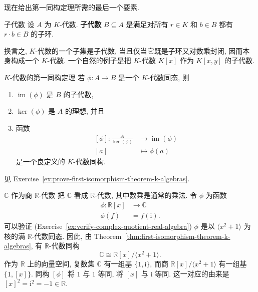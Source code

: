 现在给出第一同构定理所需的最后一个要素.

\begin{Definition}{子代数}\leavevmode\label{def:k-subalgebra}
  设 $A$ 为 $K$-代数. \textbf{子代数} $B\subseteq A$ 是满足对所有 $r\in K$ 和 $b\in B$ 都有 $r\cdot b\in B$ 的子环.
\end{Definition}

换言之, $K$-代数的一个子集是子代数, 当且仅当它既是子环又对数乘封闭, 因而本身构成一个 $K$-代数. 一个自然的例子是把 $K$-代数 $K[x]$ 作为 $K[x,y]$ 的子代数.

\begin{Theorem}{$K$-代数的第一同构定理}\leavevmode\label{thm:first-isomorphism-theorem-k-algebras}
  若 $\phi:A\to B$ 是一个 $K$-代数同态, 则
  \begin{enumerate}[label=(\roman*)]
    \item $\operatorname{im}(\phi)$ 是 $B$ 的子代数,
    \item $\ker(\phi)$ 是 $A$ 的理想, 并且
    \item 函数
    \[
      \begin{aligned}
        [\phi]:\frac{A}{\ker(\phi)}&\to\operatorname{im}(\phi)\\
        [a]&\mapsto\phi(a)
      \end{aligned}
    \]
    是一个良定义的 $K$-代数同构.
  \end{enumerate}
\end{Theorem}

\begin{Proof}
  见 Exercise~\ref{ex:prove-first-isomorphism-theorem-k-algebras}.
\end{Proof}

\begin{Example}{$\mathbb{C}$ 作为商 $\mathbb{R}$-代数}\leavevmode\label{ex:complex-numbers-as-quotient-real-algebra}
  把 $\mathbb{C}$ 看成 $\mathbb{R}$-代数, 其中数乘是通常的乘法. 令 $\phi$ 为函数
  \[
    \begin{aligned}
      \phi:\mathbb{R}[x]&\to\mathbb{C}\\
      \phi(f)&=f(\mathrm{i}).
    \end{aligned}
  \]
  可以验证 (Exercise~\ref{ex:verify-complex-quotient-real-algebra}) $\phi$ 是以 $\langle x^{2}+1\rangle$ 为核的满 $\mathbb{R}$-代数同态. 因此, 由 Theorem~\ref{thm:first-isomorphism-theorem-k-algebras}, 有 $\mathbb{R}$-代数同构
  \[
    \mathbb{C}\cong\mathbb{R}[x]/\langle x^{2}+1\rangle.
  \]
  作为 $\mathbb{R}$ 上的向量空间, 复数集 $\mathbb{C}$ 有一组基 $\{1,\mathrm{i}\}$, 而商 $\mathbb{R}[x]/\langle x^{2}+1\rangle$ 有一组基 $\{1,[x]\}$. 同构 $[\phi]$ 将 $1$ 与 $1$ 等同, 将 $[x]$ 与 $\mathrm{i}$ 等同. 这一对应的由来是 $[x]^{2}=\mathrm{i}^{2}=-1\in\mathbb{R}$.
\end{Example}

